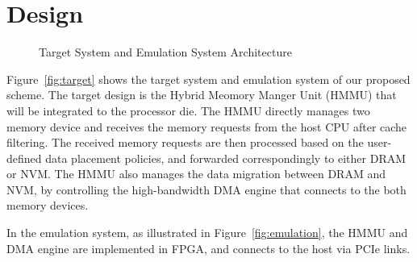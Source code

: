 \documentclass[conference]{IEEEtran}
\begin{document}
\section{Design}
\label{sec:design}
\begin{figure}[h]
\centering
\hspace*{-0.2in}
\hfil
\hspace*{-0.2in}
\caption{Target System and Emulation System Architecture}
\label{fig:architecture}
\end{figure}
Figure~\ref{fig:target} shows the target system and emulation system of our proposed scheme. The target design is the Hybrid Meomory Manger Unit (HMMU) that will be integrated to the processor die. The HMMU directly manages two memory device and receives the memory requests from the host CPU after cache filtering. 
The received memory requests are then processed based on the user-defined data placement policies, and forwarded correspondingly to either DRAM or NVM.  The HMMU also manages the data migration between DRAM and NVM, by controlling the high-bandwidth DMA engine that connects to the both memory devices.\par
In the emulation system, as illustrated in Figure~\ref{fig:emulation}, the HMMU and DMA engine are implemented in FPGA, and connects to the host via PCIe links.
\end{document}
